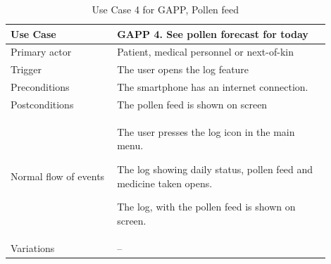 \begin{table}
	\begin{center}
	    \begin{tabular}{|p{0.3\linewidth}|p{0.6\linewidth}|}
		    \hline
		    Use Case &  GAPP 4. See pollen forecast for today \\ \hline
		    Primary actor & Patient, medical personnel or next-of-kin\\ \hline
		    Trigger & The user opens the log feature\\ \hline
		    Preconditions & The smartphone has an internet connection.\\ \hline
		    Postconditions & The pollen feed is shown on screen \\ \hline
		    Normal flow of events & 
		    	\begin{tabulenum}
		    		\item The user presses the log icon in the main menu.
		    		\item The log showing daily status, pollen feed and medicine taken opens.
		    		\item The log, with the pollen feed is shown on screen.
	    		\end{tabulenum} \\ \hline
			Variations & -- \\ \hline
		\end{tabular}
    \end{center}
    \caption{Use Case 4 for GAPP, Pollen feed}
    \label{tab:gappUseCase4}
\end{table}

